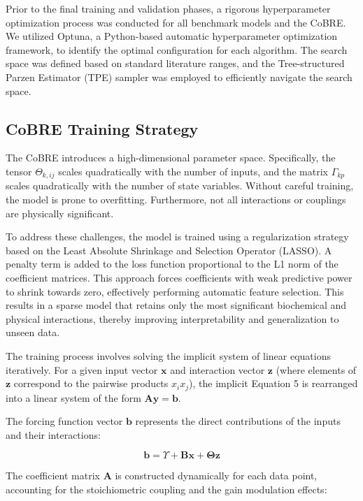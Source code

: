 \documentclass{article}
\begin{document}
Prior to the final training and validation phases, a rigorous hyperparameter optimization process was conducted for all benchmark models and the CoBRE. We utilized Optuna, a Python-based automatic hyperparameter optimization framework, to identify the optimal configuration for each algorithm. The search space was defined based on standard literature ranges, and the Tree-structured Parzen Estimator (TPE) sampler was employed to efficiently navigate the search space.

\subsection{CoBRE Training Strategy}
The CoBRE introduces a high-dimensional parameter space. Specifically, the tensor $\Theta_{k,ij}$ scales quadratically with the number of inputs, and the matrix $\Gamma_{kp}$ scales quadratically with the number of state variables. Without careful training, the model is prone to overfitting. Furthermore, not all interactions or couplings are physically significant.

To address these challenges, the model is trained using a regularization strategy based on the Least Absolute Shrinkage and Selection Operator (LASSO). A penalty term is added to the loss function proportional to the L1 norm of the coefficient matrices. This approach forces coefficients with weak predictive power to shrink towards zero, effectively performing automatic feature selection. This results in a sparse model that retains only the most significant biochemical and physical interactions, thereby improving interpretability and generalization to unseen data.

The training process involves solving the implicit system of linear equations iteratively. For a given input vector $\mathbf{x}$ and interaction vector $\mathbf{z}$ (where elements of $\mathbf{z}$ correspond to the pairwise products $x_{i} x_{j}$), the implicit Equation 5 is rearranged into a linear system of the form $\mathbf{A} \mathbf{y} = \mathbf{b}$.

The forcing function vector $\mathbf{b}$ represents the direct contributions of the inputs and their interactions:

\begin{equation}
\mathbf{b} = \Upsilon + \mathbf{B} \mathbf{x} + \mathbf{\Theta} \mathbf{z}
\end{equation}

The coefficient matrix $\mathbf{A}$ is constructed dynamically for each data point, accounting for the stoichiometric coupling and the gain modulation effects:
\end{document}
